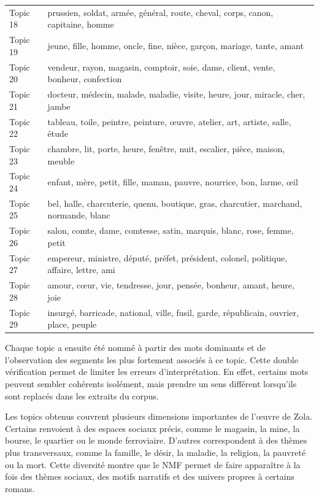 \begin{longtable}{p{1.8cm}p{11.5cm}}
Topic 18 & prussien, soldat, armée, général, route, cheval, corps, canon, capitaine, homme \\
Topic 19 & jeune, fille, homme, oncle, fine, nièce, garçon, mariage, tante, amant \\
Topic 20 & vendeur, rayon, magasin, comptoir, soie, dame, client, vente, bonheur, confection \\
Topic 21 & docteur, médecin, malade, maladie, visite, heure, jour, miracle, cher, jambe \\
Topic 22 & tableau, toile, peintre, peinture, œuvre, atelier, art, artiste, salle, étude \\
Topic 23 & chambre, lit, porte, heure, fenêtre, nuit, escalier, pièce, maison, meuble \\
Topic 24 & enfant, mère, petit, fille, maman, pauvre, nourrice, bon, larme, œil \\
Topic 25 & bel, halle, charcuterie, quenu, boutique, gras, charcutier, marchand, normande, blanc \\
Topic 26 & salon, comte, dame, comtesse, satin, marquis, blanc, rose, femme, petit \\
Topic 27 & empereur, ministre, député, préfet, président, colonel, politique, affaire, lettre, ami \\
Topic 28 & amour, cœur, vie, tendresse, jour, pensée, bonheur, amant, heure, joie \\
Topic 29 & insurgé, barricade, national, ville, fusil, garde, républicain, ouvrier, place, peuple \\
\bottomrule
\end{longtable}

Chaque topic a ensuite été nommé à partir des mots dominants et de l'observation des segments les plus fortement associés à ce topic. Cette double vérification permet de limiter les erreurs d'interprétation. En effet, certains mots peuvent sembler cohérents isolément, mais prendre un sens différent lorsqu'ils sont replacés dans les extraits du corpus.

Les topics obtenus couvrent plusieurs dimensions importantes de l'œuvre de Zola. Certains renvoient à des espaces sociaux précis, comme le magasin, la mine, la bourse, le quartier ou le monde ferroviaire. D'autres correspondent à des thèmes plus transversaux, comme la famille, le désir, la maladie, la religion, la pauvreté ou la mort. Cette diversité montre que le NMF permet de faire apparaître à la fois des thèmes sociaux, des motifs narratifs et des univers propres à certains romans.

